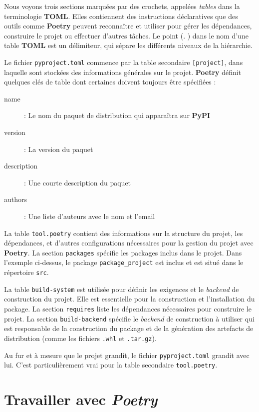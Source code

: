 Nous voyons trois sections marquées par des crochets, appelées \og \textit{tables} \fg{} dans la terminologie \textbf{TOML}. Elles contiennent des instructions déclaratives que des outils comme \textbf{Poetry} peuvent reconnaître et utiliser pour gérer les dépendances, construire le projet ou effectuer d'autres tâches. Le point (\og . \fg{}) dans le nom d'une table \textbf{TOML} est un délimiteur, qui sépare les différents niveaux de la hiérarchie.


Le fichier \texttt{pyproject.toml} commence par la table secondaire \texttt{[project]}, dans laquelle sont stockées des informations générales sur le projet. \textbf{Poetry} définit quelques clés de table dont certaines doivent toujours être spécifiées :
\begin{description}
    \item[name] : Le nom du paquet de distribution qui apparaîtra sur \textbf{PyPI}
    \item[version] : La version du paquet
    \item[description] : Une courte description du paquet
    \item[authors] : Une liste d'auteurs avec le nom et l'email
\end{description}

La table \texttt{tool.poetry} contient des informations sur la structure du projet, les dépendances, et d'autres configurations nécessaires pour la gestion du projet avec \textbf{Poetry}. La section \texttt{packages} spécifie les packages inclus dans le projet. Dans l'exemple ci-dessus, le package \texttt{package\_project} est inclus et est situé dans le répertoire \texttt{src}.

La table \texttt{build-system} est utilisée pour définir les exigences et le \textit{backend} de construction du projet. Elle est essentielle pour la construction et l'installation du package. La section \texttt{requires} liste les dépendances nécessaires pour construire le projet. La section \texttt{build-backend} spécifie le \textit{backend} de construction à utiliser qui est responsable de la construction du package et de la génération des artefacts de distribution (comme les fichiers \texttt{.whl} et \texttt{.tar.gz}).

Au fur et à mesure que le projet grandit, le fichier \texttt{pyproject.toml} grandit avec lui. C'est particulièrement vrai pour la table secondaire \texttt{tool.poetry}.

\section{Travailler avec \textit{Poetry}}

